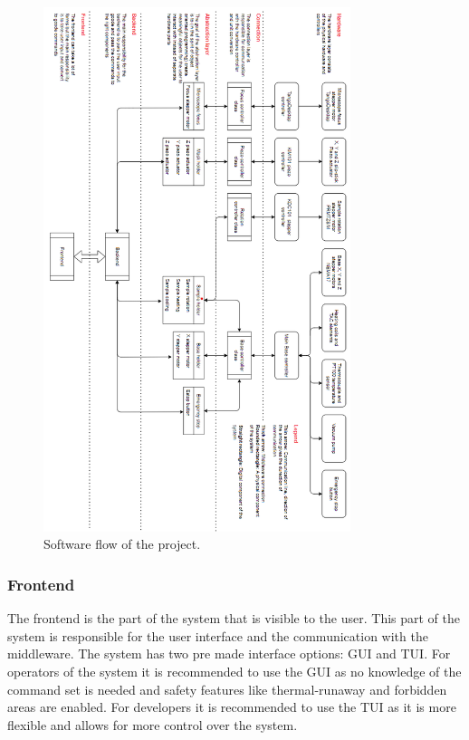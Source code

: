 \documentclass[10pt]{article}
\begin{document}
\begin{figure}[htp]
  \centering
  \includegraphics[width=0.8\textwidth]{img/design_cycle/code_flow.png}
  \caption{Software flow of the project.}
  \label{fig:software_architecture}
\end{figure}

\subsubsection{Frontend}
The frontend is the part of the system that is visible to the user.
This part of the system is responsible for the user interface and the communication with the middleware.
The system has two pre made interface options: GUI and TUI.
For operators of the system it is recommended to use the GUI as no knowledge of the command set is needed and safety features like thermal-runaway and forbidden areas are enabled.
For developers it is recommended to use the TUI as it is more flexible and allows for more control over the system.
\end{document}
